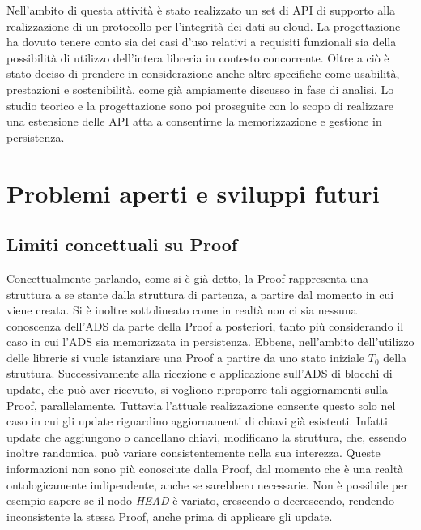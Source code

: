 
	Nell'ambito di questa attività è stato realizzato un set di API di supporto alla realizzazione di un protocollo per l'integrità dei dati su cloud. La progettazione ha dovuto tenere conto sia dei casi d'uso relativi a requisiti funzionali sia della possibilità di utilizzo dell'intera libreria in contesto concorrente. Oltre a ciò è stato deciso di prendere in considerazione anche altre specifiche come usabilità, prestazioni e sostenibilità, come già ampiamente discusso in fase di analisi. Lo studio teorico e la progettazione sono poi proseguite con lo scopo di realizzare una estensione delle API atta a consentirne la memorizzazione e gestione in persistenza.

\section{Problemi aperti e sviluppi futuri}

	\subsection{Limiti concettuali su Proof}
	

		Concettualmente parlando, come si è già detto, la Proof rappresenta una struttura a se stante dalla struttura di partenza, a partire dal momento in cui viene creata. Si è inoltre sottolineato come in realtà non ci sia nessuna conoscenza dell'ADS da parte della Proof a posteriori, tanto più considerando il caso in cui l'ADS sia memorizzata in persistenza.
		Ebbene, nell'ambito dell'utilizzo delle librerie si vuole istanziare una Proof a partire da uno stato iniziale $ T_{0} $ della struttura. Successivamente alla ricezione e applicazione sull'ADS di blocchi di update, che può aver ricevuto, si vogliono riproporre tali aggiornamenti sulla Proof, parallelamente. Tuttavia l'attuale realizzazione consente questo solo nel caso in cui gli update riguardino aggiornamenti di chiavi già esistenti. Infatti update che aggiungono o cancellano chiavi, modificano la struttura, che, essendo inoltre randomica, può variare consistentemente nella sua interezza. Queste informazioni non sono più conosciute dalla Proof, dal momento che è una realtà ontologicamente indipendente, anche se sarebbero necessarie. Non è possibile per esempio sapere se il nodo \textit{HEAD} è variato, crescendo o decrescendo, rendendo inconsistente la stessa Proof, anche prima di applicare gli update.
	
